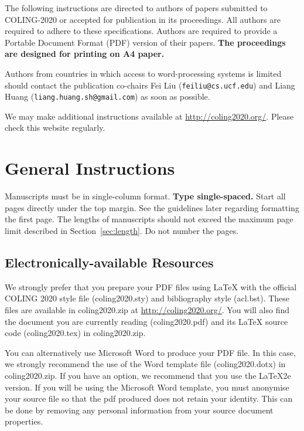 \documentclass[11pt]{article}
\begin{document}
The following instructions are directed to authors of papers submitted
to COLING-2020 or accepted for publication in its proceedings. All
authors are required to adhere to these specifications. Authors are
required to provide a Portable Document Format (PDF) version of their
papers. \textbf{The proceedings are designed for printing on A4
  paper.}

Authors from countries in which access to word-processing systems is
limited should contact the publication co-chairs
Fei Liu
(\texttt{feiliu@cs.ucf.edu}) and
Liang Huang (\texttt{liang.huang.sh@gmail.com})
as soon as possible.

We may make additional instructions available at \url{http://coling2020.org/}. Please check
this website regularly.


\section{General Instructions}

Manuscripts must be in single-column format. {\bf Type single-spaced.}  Start all
pages directly under the top margin. See the guidelines later
regarding formatting the first page. The lengths of manuscripts
should not exceed the maximum page limit described in Section~\ref{sec:length}.
Do not number the pages.


\subsection{Electronically-available Resources}

We strongly prefer that you prepare your PDF files using \LaTeX{} with
the official COLING 2020 style file (coling2020.sty) and bibliography style
(acl.bst). These files are available in coling2020.zip 
at \url{http://coling2020.org/}.
You will also find the document
you are currently reading (coling2020.pdf) and its \LaTeX{} source code
(coling2020.tex) in coling2020.zip. 

You can alternatively use Microsoft Word to produce your PDF file. In
this case, we strongly recommend the use of the Word template file
(coling2020.dotx) in coling2020.zip. If you have an option, we
recommend that you use the \LaTeX2e{} version. If you will be
  using the Microsoft Word template, you must anonymise
  your source file so that the pdf produced does not retain your
  identity.  This can be done by removing any personal information
from your source document properties.
\end{document}
